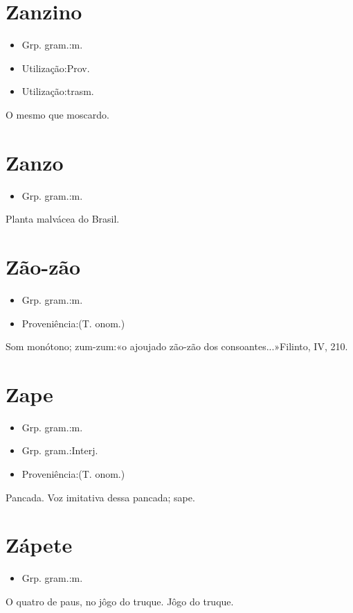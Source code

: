 \section{Zanzino}
\begin{itemize}
\item {Grp. gram.:m.}
\end{itemize}
\begin{itemize}
\item {Utilização:Prov.}
\end{itemize}
\begin{itemize}
\item {Utilização:trasm.}
\end{itemize}
O mesmo que \textunderscore moscardo\textunderscore .
\section{Zanzo}
\begin{itemize}
\item {Grp. gram.:m.}
\end{itemize}
Planta malvácea do Brasil.
\section{Zão-zão}
\begin{itemize}
\item {Grp. gram.:m.}
\end{itemize}
\begin{itemize}
\item {Proveniência:(T. onom.)}
\end{itemize}
Som monótono; zum-zum:«\textunderscore o ajoujado zão-zão dos consoantes...\textunderscore »Filinto, IV, 210.
\section{Zape}
\begin{itemize}
\item {Grp. gram.:m.}
\end{itemize}
\begin{itemize}
\item {Grp. gram.:Interj.}
\end{itemize}
\begin{itemize}
\item {Proveniência:(T. onom.)}
\end{itemize}
Pancada.
Voz imitativa dessa pancada; sape.
\section{Zápete}
\begin{itemize}
\item {Grp. gram.:m.}
\end{itemize}
O quatro de paus, no jôgo do truque.
Jôgo do truque.
